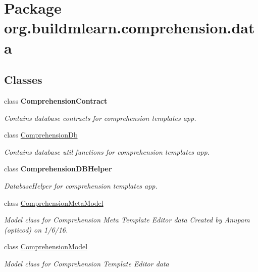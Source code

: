 \hypertarget{namespaceorg_1_1buildmlearn_1_1comprehension_1_1data}{}\section{Package org.\+buildmlearn.\+comprehension.\+data}
\label{namespaceorg_1_1buildmlearn_1_1comprehension_1_1data}
\subsection*{Classes}
\begin{DoxyCompactItemize}
\item 
class {\bfseries Comprehension\+Contract}
\begin{DoxyCompactList}\small\item\em Contains database contracts for comprehension template\textquotesingle{}s app. \end{DoxyCompactList}\item 
class \hyperlink{classorg_1_1buildmlearn_1_1comprehension_1_1data_1_1ComprehensionDb}{Comprehension\+Db}
\begin{DoxyCompactList}\small\item\em Contains database util functions for comprehension template\textquotesingle{}s app. \end{DoxyCompactList}\item 
class {\bfseries Comprehension\+D\+B\+Helper}
\begin{DoxyCompactList}\small\item\em Database\+Helper for comprehension template\textquotesingle{}s app. \end{DoxyCompactList}\item 
class \hyperlink{classorg_1_1buildmlearn_1_1comprehension_1_1data_1_1ComprehensionMetaModel}{Comprehension\+Meta\+Model}
\begin{DoxyCompactList}\small\item\em Model class for Comprehension Meta Template Editor data Created by Anupam (opticod) on 1/6/16. \end{DoxyCompactList}\item 
class \hyperlink{classorg_1_1buildmlearn_1_1comprehension_1_1data_1_1ComprehensionModel}{Comprehension\+Model}
\begin{DoxyCompactList}\small\item\em Model class for Comprehension Template Editor data 


\end{DoxyCompactList}
\end{DoxyCompactItemize}
